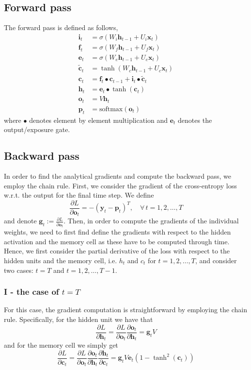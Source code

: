 \documentclass{article}
\begin{document}
\subsection*{Forward pass}
	The forward pass is defined as follows, 
	\begin{align*}
		\bm{i}_t &= \sigma(W_i \bm{h}_{t-1} + U_i\bm{x}_t) \\
		\bm{f}_t &= \sigma(W_f \bm{h}_{t-1} + U_f\bm{x}_t) \\
		\bm{e}_t &= \sigma(W_e \bm{h}_{t-1} + U_e\bm{x}_t) \\
		\tilde{\bm{c}}_t &= \tanh(W_c\bm{h}_{t-1} + U_c\bm{x}_t) \\
		\bm{c}_t &= \bm{f}_t \bullet \bm{c}_{t-1} + \bm{i}_t \bullet \tilde{\bm{c}}_t \\
		\bm{h}_t &= \bm{e}_t \bullet \tanh(\bm{c}_t)\\
		\bm{o}_t &= V \bm{h}_t \\
		\bm{p}_t &= \text{softmax}(\bm{o}_t)
	\end{align*}
	where $\bullet$ denotes element by element multiplication and $\bm{e}_t$ denotes the output/exposure gate. 

\subsection*{Backward pass}
	In order to find the analytical gradients and compute the backward pass, we employ the chain rule. First, we consider the gradient of the cross-entropy loss w.r.t. the output for the final time step. We define 
	$$\frac{\partial L}{\partial \bm{o}_t} = -(\bm{y}_t - \bm{p}_t)^T, \quad \forall\, t = 1, 2, \dots, T$$
	and denote $\bm{g}_t := \frac{\partial L}{\partial \bm{o}_t}$. Then, in order to compute the gradients of the individual weights, we need to first find define the gradients with respect to the hidden activation and the memory cell as these have to be computed through time. Hence, we  first consider the partial derivative of the loss with respect to the hidden units and the memory cell, i.e. $h_t$ and $c_t$ for $t = 1, 2, \dots, T$, and consider two cases: $t= T$ and $t = 1, 2, \dots, T-1$. 

\subsubsection*{I - the case of $t = T$}
	For this case, the gradient computation is straightforward by employing the chain rule. Specifically, for the hidden unit we have that
	$$\frac{\partial L}{\partial \bm{h}_t} = \frac{\partial L}{\partial \bm{o}_t} \frac{\partial\bm{o}_t}{\partial \bm{h}_t} = \bm{g}_t V$$ 
	and for the memory cell we simply get
	$$\frac{\partial L}{\partial \bm{c}_t} = \frac{\partial L}{\partial \bm{o}_t} \frac{\partial\bm{o}_t}{\partial \bm{h}_t} \frac{\partial\bm{h}_t}{\partial \bm{c}_t} = \bm{g}_t V \bm{e}_t (1 - \tanh^2(\bm{c}_t))$$
\end{document}
